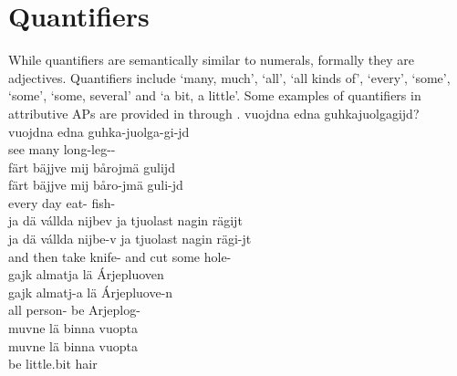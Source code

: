 \section{Quantifiers}\label{quantifiers}
While quantifiers are semantically similar to numerals, formally they are adjectives. %
Quantifiers include %
 ‘many, much’,  ‘all’,  ‘all kinds of’,  ‘every’,  ‘some’,  ‘some’,  ‘some, several’ and  ‘a bit, a little’. %
Some examples of quantifiers in attributive APs are provided in  %
through .
\ea\label{quantEx1}%
\glll	vuojdna edna guhkajuolgagijd?\\
	vuojdna edna guhka-juolga-gi-jd\\
	see\BS{} many long-leg--\\\nopagebreak
{}	
\z
\ea\label{quantEx2a}%
\glll	färt bäjjve mij bårojmä gulijd\\
	färt bäjjve mij båro-jmä guli-jd\\
	every day\BS{}  eat- fish-\\\nopagebreak
{}	
\z
\ea\label{quantEx2b}%
\glll	ja dä vállda nijbev ja tjuolast nagin rägijt\\
	ja dä vállda nijbe-v ja tjuolast nagin rägi-jt\\
	and then take\BS{} knife- and cut\BS{} some hole-\\\nopagebreak
{}	
\z
\ea\label{quantEx3}%
\glll	gajk almatja lä Árjepluoven\\
	gajk almatj-a lä Árjepluove-n\\
	all person- be\BS{} Arjeplog-\\\nopagebreak
{}	
\z
\ea\label{quantEx4}%
\glll	muvne lä binna vuopta\\
	muvne lä binna vuopta\\
	 be\BS{} little.bit hair\BS{}\\\nopagebreak
{}	
\z

